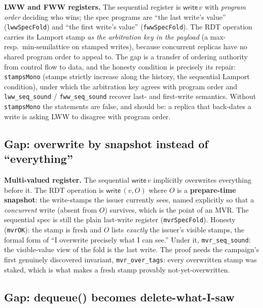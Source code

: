 \documentclass[11pt]{article}
\newcommand{\code}[1]{\texttt{#1}}
\begin{document}
\textbf{LWW and FWW registers.} The sequential register is
$\mathsf{write}\,v$ with \emph{program order} deciding who wins; the
spec programs are ``the last write's value'' (\code{lwwSpecFold}) and
``the first write's value'' (\code{fwwSpecFold}). The RDT operation
carries its Lamport stamp \emph{as the arbitration key in the payload}
(a max- resp.\ min-semilattice on stamped writes), because concurrent
replicas have no shared program order to appeal to. The gap is a
transfer of ordering authority from control flow to data, and the
honesty condition is precisely its repair: \code{stampsMono} (stamps
strictly increase along the history, the sequential Lamport
condition), under which the arbitration key agrees with program order
and \code{lww\_seq\_sound} / \code{fww\_seq\_sound} recover last- and
first-write semantics. Without \code{stampsMono} the statements are
false, and should be: a replica that back-dates a write is asking LWW
to disagree with program order.

\subsection{Gap: overwrite by snapshot instead of ``everything''}

\textbf{Multi-valued register.} The sequential $\mathsf{write}\,v$
implicitly overwrites everything before it. The RDT operation is
$\mathsf{write}\,(v, O)$ where $O$ is a \textbf{prepare-time
snapshot}: the write-stamps the issuer currently sees, named
explicitly so that a \emph{concurrent} write (absent from $O$)
survives, which is the point of an MVR. The sequential spec is still
the plain last-write register (\code{mvrSpecFold}). Honesty
(\code{mvrOK}): the stamp is fresh and $O$ lists \emph{exactly} the
issuer's visible stamps, the formal form of ``I overwrite precisely
what I can see.'' Under it, \code{mvr\_seq\_sound}: the visible-value
view of the fold is the last write. The proof needs the campaign's
first genuinely discovered invariant, \code{mvr\_over\_tags}: every
overwritten stamp was staked, which is what makes a fresh stamp
provably not-yet-overwritten.

\subsection{Gap: dequeue() becomes delete-what-I-saw}
\label{sec:queue}
\end{document}
